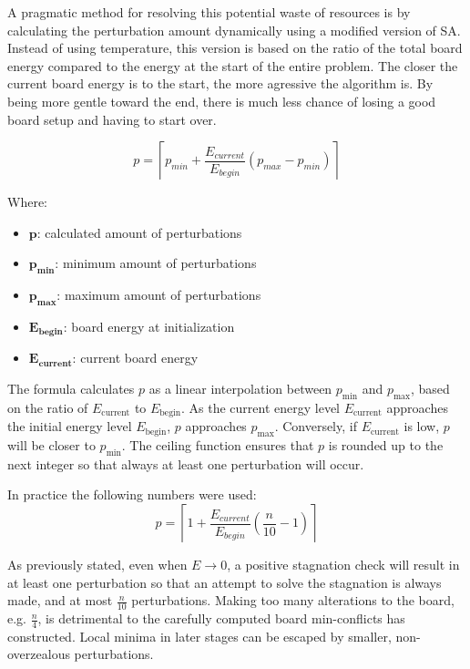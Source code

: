 \documentclass{article}
\begin{document}
A pragmatic method for resolving this potential waste of resources is by calculating the perturbation amount dynamically using a modified version of SA.
Instead of using temperature, this version is based on the ratio of the total board energy compared to the energy at the start of the entire problem.
The closer the current board energy is to the start, the more agressive the algorithm is. By being more gentle toward the end,
there is much less chance of losing a good board setup and having to start over.

\[
    p = \left\lceil p_{min}+\frac{E_{current}}{E_{begin}} \left(p_{max} - p_{min}\right)\right\rceil
\]

Where:

\begin{itemize}
    \item $\mathbf{p}$: calculated amount of perturbations
    \item $\mathbf{p_{min}}$: minimum amount of perturbations
    \item $\mathbf{p_{max}}$: maximum amount of perturbations
    \item $\mathbf{E_{begin}}$: board energy at initialization
    \item $\mathbf{E_{current}}$: current board energy
\end{itemize}

The formula calculates \( p \) as a linear interpolation between \( p_{\text{min}} \) and \( p_{\text{max}} \),
based on the ratio of \( E_{\text{current}} \) to \( E_{\text{begin}} \).
As the current energy level \( E_{\text{current}} \) approaches the initial energy level \( E_{\text{begin}} \),
\( p \) approaches \( p_{\text{max}} \).
Conversely, if \( E_{\text{current}} \) is low, \( p \) will be closer to \( p_{\text{min}} \).
The ceiling function ensures that \( p \) is rounded up to the next integer so that always at least one perturbation will occur.


In practice the following numbers were used:
\[
    p = \left\lceil 1+\frac{E_{current}}{E_{begin}} \left(\frac{n}{10} - 1\right)\right\rceil
\]

As previously stated, even when $E\to0$, a positive stagnation check will result in at least one perturbation so that an attempt to solve the stagnation is always made,
and at most $\frac{n}{10}$ perturbations.
Making too many alterations to the board, e.g. $\frac{n}{4}$, is detrimental to the carefully computed board min-conflicts has constructed.
Local minima in later stages can be escaped by smaller, non-overzealous perturbations.
\end{document}
